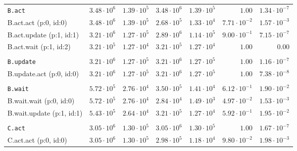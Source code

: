 \begin{table}[htbp]
{\begin{tabular}{lrrrrrr}
\\[-8pt]\texttt{B.act}                & $3.48 \cdot 10^{6}$ & $1.39 \cdot 10^{5}$ & $3.48 \cdot 10^{6}$ & $1.39 \cdot 10^{5}$ &               $1.00$ & $1.34 \cdot 10^{-7}$ \\
\hspace{3mm}B.act.act (p:0, id:0)     & $3.48 \cdot 10^{6}$ & $1.39 \cdot 10^{5}$ & $2.68 \cdot 10^{5}$ & $1.33 \cdot 10^{4}$ & $7.71 \cdot 10^{-2}$ & $1.57 \cdot 10^{-3}$ \\
\hspace{3mm}B.act.update (p:1, id:1)  & $3.21 \cdot 10^{6}$ & $1.27 \cdot 10^{5}$ & $2.89 \cdot 10^{6}$ & $1.14 \cdot 10^{5}$ & $9.00 \cdot 10^{-1}$ & $7.15 \cdot 10^{-7}$ \\
\hspace{3mm}B.act.wait (p:1, id:2)    & $3.21 \cdot 10^{5}$ & $1.27 \cdot 10^{4}$ & $3.21 \cdot 10^{5}$ & $1.27 \cdot 10^{4}$ &               $1.00$ &               $0.00$ \\
\\[-8pt]\texttt{B.update}             & $3.21 \cdot 10^{6}$ & $1.27 \cdot 10^{5}$ & $3.21 \cdot 10^{6}$ & $1.27 \cdot 10^{5}$ &               $1.00$ & $1.16 \cdot 10^{-7}$ \\
\hspace{3mm}B.update.act (p:0, id:0)  & $3.21 \cdot 10^{6}$ & $1.27 \cdot 10^{5}$ & $3.21 \cdot 10^{6}$ & $1.27 \cdot 10^{5}$ &               $1.00$ & $7.38 \cdot 10^{-8}$ \\
\\[-8pt]\texttt{B.wait}               & $5.72 \cdot 10^{5}$ & $2.76 \cdot 10^{4}$ & $3.50 \cdot 10^{5}$ & $1.41 \cdot 10^{4}$ & $6.12 \cdot 10^{-1}$ & $1.90 \cdot 10^{-2}$ \\
\hspace{3mm}B.wait.wait (p:0, id:0)   & $5.72 \cdot 10^{5}$ & $2.76 \cdot 10^{4}$ & $2.84 \cdot 10^{4}$ & $1.49 \cdot 10^{3}$ & $4.97 \cdot 10^{-2}$ & $1.53 \cdot 10^{-3}$ \\
\hspace{3mm}B.wait.update (p:1, id:1) & $5.43 \cdot 10^{5}$ & $2.64 \cdot 10^{4}$ & $3.21 \cdot 10^{5}$ & $1.27 \cdot 10^{4}$ & $5.92 \cdot 10^{-1}$ & $1.95 \cdot 10^{-2}$ \\
\\[-8pt]\texttt{C.act}                & $3.05 \cdot 10^{6}$ & $1.30 \cdot 10^{5}$ & $3.05 \cdot 10^{6}$ & $1.30 \cdot 10^{5}$ &               $1.00$ & $1.67 \cdot 10^{-7}$ \\
\hspace{3mm}C.act.act (p:0, id:0)     & $3.05 \cdot 10^{6}$ & $1.30 \cdot 10^{5}$ & $2.98 \cdot 10^{5}$ & $1.18 \cdot 10^{4}$ & $9.80 \cdot 10^{-2}$ & $1.98 \cdot 10^{-3}$ \\

\end{tabular}}
\end{table}
